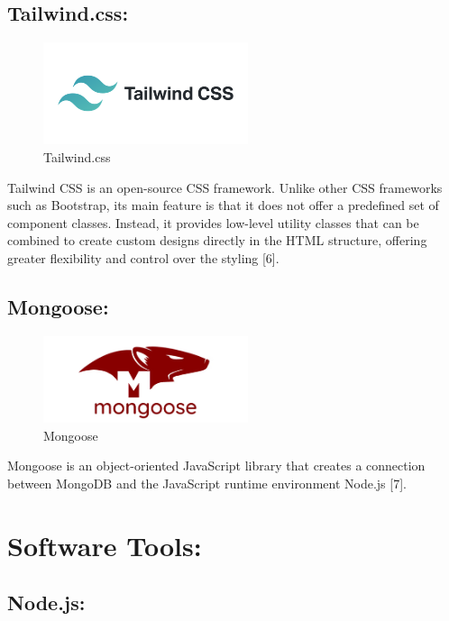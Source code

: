 \subsection{Tailwind.css:}

\begin{figure}[!h]
\begin{center}
\includegraphics[width=6cm]{images/Tailwind.png}
\end{center}
\caption{Tailwind.css}
\end{figure}

Tailwind CSS is an open-source CSS framework. Unlike other CSS frameworks such as Bootstrap, its main feature is that it does not offer a predefined set of component classes. Instead, it provides low-level utility classes that can be combined to create custom designs directly in the HTML structure, offering greater flexibility and control over the styling [6].

\subsection{Mongoose:}

\begin{figure}[!h]
\begin{center}
\includegraphics[width=6cm]{images/Mongoose.png}
\end{center}
\caption{Mongoose}
\end{figure}

Mongoose is an object-oriented JavaScript library that creates a connection between MongoDB and the JavaScript runtime environment Node.js [7].

\section{Software Tools:}

\subsection{Node.js:}

